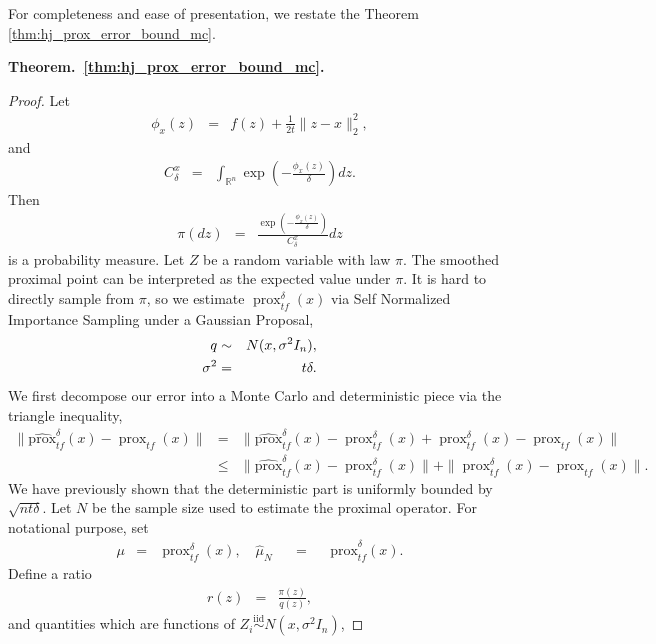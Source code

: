 \documentclass{article}
\newcommand{\Real}{\mathbb{R}}
\newcommand{\sampledhjprox}{\operatorname{\widehat{prox}}^{\delta}}
\newcommand{\prox}{\operatorname{prox}}
\newcommand{\hjprox}{\operatorname{prox}^{\delta}}
\newcommand{\amp}{\mathop{\:\:\,}\nolimits}
\theoremstyle{plain}
\theoremstyle{definition}
\theoremstyle{remark}
\begin{document}
For completeness and ease of presentation, we restate the Theorem \ref{thm:hj_prox_error_bound_mc}.

\noindent \textbf{Theorem.~\ref{thm:hj_prox_error_bound_mc}.}
\textit{}


\begin{proof}
Let 
\begin{eqnarray}
    \phi_x(z) &=& f(z) + \frac{1}{2t}\|z-x\|_2^2,
\end{eqnarray}
and 
\begin{eqnarray}
    C^x_\delta &=& \int_{\Real^n} \exp\left(-\frac{\phi_x(z)}{\delta}\right)dz.
\end{eqnarray}
Then 
\begin{eqnarray}
    \pi(dz)  &=& \frac{\exp\left(-\frac{\phi_x(z)}{\delta}\right)}{C^x_\delta}dz
\end{eqnarray}
is a probability measure. Let $Z$ be a random variable with law $\pi$. The smoothed proximal point can be interpreted as the expected value under $\pi$. It is hard to directly sample from $\pi$, so we estimate $\hjprox_{tf}(x)$ via Self Normalized Importance Sampling under a Gaussian Proposal, 
\begin{eqnarray}
    q & \sim &\mathnormal{N}(x,\sigma^2 I_n), \\ \sigma^2 &=& t\delta. 
\end{eqnarray}
We first decompose our error into a Monte Carlo and deterministic piece via the triangle inequality, 
    \begin{eqnarray}
    \|\sampledhjprox_{tf}(x) - \prox_{tf}(x)\|&=& \|\sampledhjprox_{tf}(x) -\hjprox_{tf}(x) + \hjprox_{tf}(x) -\prox_{tf}(x)\|\\
    &\leq& \|\sampledhjprox_{tf}(x) - \hjprox_{tf}(x)\| + \|\hjprox_{tf}(x) - \prox_{tf}(x)\|. \label{eq: Error Triangle Inequality}
\end{eqnarray}
We have previously shown that the deterministic part is uniformly bounded by $\sqrt{nt\delta}$. Let $N$ be the sample size used to estimate the proximal operator. For notational purpose, set
\begin{eqnarray}
    \mu & = & \hjprox_{tf}(x), \quad
    \hat{\mu}_N  \amp = \amp \sampledhjprox_{tf}(x).
\end{eqnarray}
Define a ratio 
\begin{eqnarray}
    r(z) &=& \frac{\pi(z)}{q(z)},
\end{eqnarray}
and quantities which are functions of $Z_i \overset{\mathrm{iid}}\sim N(x, \sigma^2I_n)$, 

\end{proof}
\end{document}
